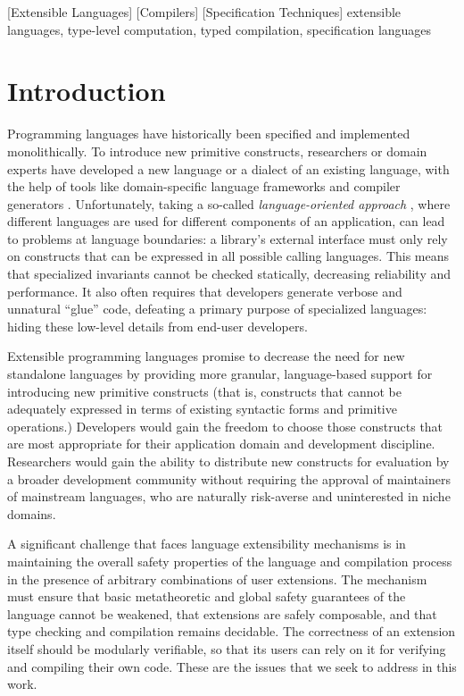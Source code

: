 \documentclass[10pt]{sigplanconf}
\begin{document}
[Extensible Languages]
[Compilers]
[Specification Techniques]
\keywords
extensible languages, type-level computation, typed compilation, specification languages
\section{Introduction}
Programming languages have historically been specified and implemented monolithically. To introduce new primitive constructs, researchers or domain experts have developed a new language or a dialect of an existing language, with the help of tools like domain-specific language frameworks and compiler generators \cite{fowler2010domain}. 
Unfortunately, taking a so-called {\it language-oriented approach} \cite{journals/stp/Ward94}, where different languages are used for different components of an application, can lead to problems at language boundaries: a library's external interface must only rely on  constructs that can be expressed in all possible calling languages. This means that specialized invariants cannot be checked statically, decreasing reliability and performance. It also often requires that developers generate verbose and unnatural ``glue'' code, defeating a primary purpose of specialized languages: hiding these low-level details from end-user developers.

Extensible programming languages promise to decrease the need for new standalone languages by providing more granular, language-based support for introducing new primitive constructs (that is, constructs that cannot be adequately expressed in terms of existing syntactic forms and primitive operations.) Developers would gain the freedom to choose those constructs that are most appropriate for their application domain and development discipline. Researchers would gain the ability to distribute new constructs for evaluation by a broader development community without requiring the approval of maintainers of mainstream languages, who are naturally risk-averse and uninterested in niche domains.

A significant challenge that faces language extensibility mechanisms is in maintaining the overall safety properties of the language and compilation process in the presence of arbitrary combinations of user extensions. The mechanism must ensure that basic metatheoretic and global safety guarantees of the language cannot be weakened, that extensions are safely composable, and that type checking and compilation remains decidable. The correctness of an extension itself should be modularly verifiable, so that its users can rely on it for verifying and compiling their own code. These are the issues that we seek to address in this work.
\end{document}
